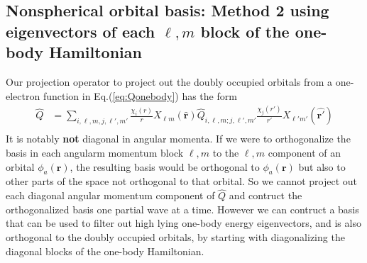 \documentclass[%
pra%
,twocolumn%
,amssymb, nobibnotes, aps,
longbibliography
]{revtex4-1}
\begin{document}
\subsection{Nonspherical orbital basis: Method 2 using eigenvectors of each $\ell,m$ block of the one-body Hamiltonian}
\label{sec:lorbs}


Our projection operator to project out the doubly occupied orbitals from a one-electron function in Eq.(\ref{eq:Qonebody}) has the form
\begin{equation}
\begin{split}
\hat{Q}&=  \sum_{i ,\ell,m, j, \ell',m'} \frac{\chi_i(r)}{r} X_{\ell m} (  \mathbf{\hat{r}} )\hat{Q}_{i,\ell,m ; j, \ell',m'}   \frac{ \chi_j(r') }{r'} X_{\ell' m'} (  \mathbf{\hat{r'}} ) \\
\end{split}
\label{eq:Q1}
\end{equation}
It is notably \textbf{not} diagonal in angular momenta.  If we were to orthogonalize the basis in each angularm momentum block $\ell,m$ to the $\ell,m$ component of an orbital $\phi_a(\mathbf{r})$, the resulting basis would be orthogonal to $\phi_a(\mathbf{r})$ but also to other parts of the space not orthogonal to that orbital.  So we cannot project out each diagonal angular momentum component of $\hat{Q}$ and contruct the orthogonalized basis one partial wave at a time.  However we can contruct a basis that can be used to filter out high lying one-body energy eigenvectors, and is also orthogonal to the doubly occupied orbitals,  by starting with diagonalizing the diagonal blocks of the one-body Hamiltonian.
\end{document}
